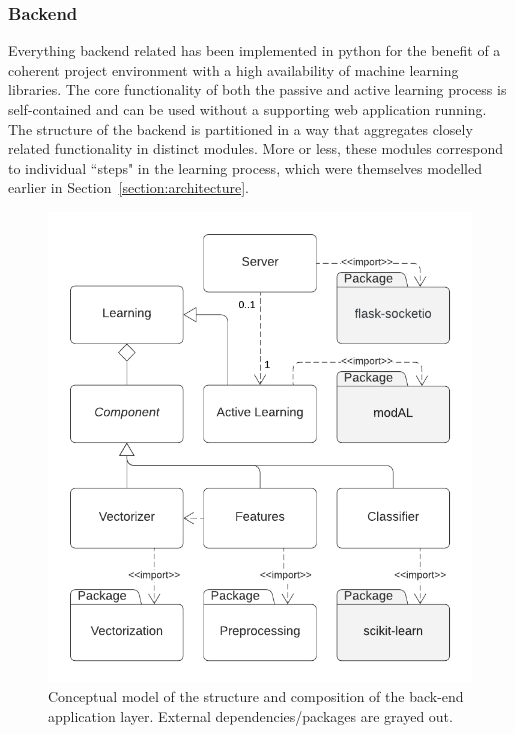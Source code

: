 \documentclass[a4paper,12pt]{article}
\begin{document}
\subsubsection{Backend}
Everything backend related has been implemented in python for the benefit of a coherent project environment with a high availability of machine learning libraries. The core functionality of both the passive and active learning process is self-contained and can be used without a supporting web application running. The structure of the backend is partitioned in a way that aggregates closely related functionality in distinct modules. More or less, these modules correspond to individual ``steps" in the learning process, which were themselves modelled earlier in Section~\ref{section:architecture}. 
\begin{figure}[H]
\centering
\includegraphics[scale=0.9]{module_deps.pdf}
\captionsetup{justification=centering}
\caption{\label{fig:pythonmodules}Conceptual model of the structure and composition of the back-end application layer. External dependencies/packages are grayed out.}
\end{figure}
\end{document}
